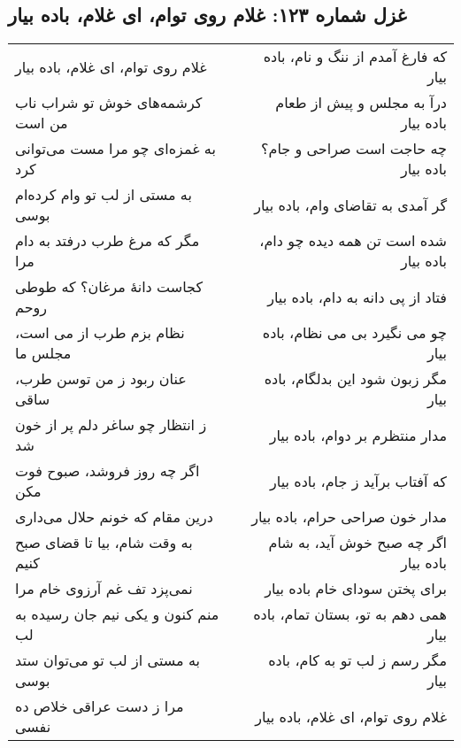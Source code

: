 \begin{center}
\section*{غزل شماره ۱۲۳: غلام روی توام، ای غلام، باده بیار}
\label{sec:123}
\begin{longtable}{l p{0.5cm} r}
غلام روی توام، ای غلام، باده بیار
&&
که فارغ آمدم از ننگ و نام، باده بیار
\\
کرشمه‌های خوش تو شراب ناب من است
&&
درآ به مجلس و پیش از طعام باده بیار
\\
به غمزه‌ای چو مرا مست می‌توانی کرد
&&
چه حاجت است صراحی و جام؟ باده بیار
\\
به مستی از لب تو وام کرده‌ام بوسی
&&
گر آمدی به تقاضای وام، باده بیار
\\
مگر که مرغ طرب درفتد به دام مرا
&&
شده است تن همه دیده چو دام، باده بیار
\\
کجاست دانهٔ مرغان؟ که طوطی روحم
&&
فتاد از پی دانه به دام، باده بیار
\\
نظام بزم طرب از می است، مجلس ما
&&
چو می نگیرد بی می نظام، باده بیار
\\
عنان ربود ز من توسن طرب، ساقی
&&
مگر زبون شود این بدلگام، باده بیار
\\
ز انتظار چو ساغر دلم پر از خون شد
&&
مدار منتظرم بر دوام، باده بیار
\\
اگر چه روز فروشد، صبوح فوت مکن
&&
که آفتاب برآید ز جام، باده بیار
\\
درین مقام که خونم حلال می‌داری
&&
مدار خون صراحی حرام، باده بیار
\\
به وقت شام، بیا تا قضای صبح کنیم
&&
اگر چه صبح خوش آید، به شام باده بیار
\\
نمی‌پزد تف غم آرزوی خام مرا
&&
برای پختن سودای خام باده بیار
\\
منم کنون و یکی نیم جان رسیده به لب
&&
همی دهم به تو، بستان تمام، باده بیار
\\
به مستی از لب تو می‌توان ستد بوسی
&&
مگر رسم ز لب تو به کام، باده بیار
\\
مرا ز دست عراقی خلاص ده نفسی
&&
غلام روی توام، ای غلام، باده بیار
\\
\end{longtable}
\end{center}
